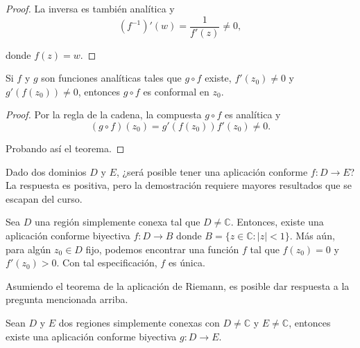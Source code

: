 \begin{proof}
La inversa es también analítica y
$$\left( f^{-1}\right)'(w) = \frac{1}{f'(z)} \neq 0,$$

donde $f(z) = w$.
\end{proof}

\begin{propo}
Si $f$ y $g$ son funciones analíticas tales que $g \circ f$ existe, $f'(z_0) \neq 0$ y $g'(f(z_0)) \neq 0$, entonces $g \circ f$ es conformal en $z_0$.
\end{propo}

\begin{proof}
Por la regla de la cadena, la compuesta $g \circ f$ es analítica y
$$(g\circ f) (z_0) = g'(f(z_0)) f'(z_0) \neq 0.$$

Probando así el teorema.

\end{proof}

Dado dos dominios $D$ y $E$, ¿será posible tener una aplicación conforme $f: D \rightarrow E$? La respuesta es positiva, pero la demostración requiere mayores resultados que se escapan del curso.

\begin{teorema} \label{RiemannMap}
Sea $D$ una región simplemente conexa tal que $D \neq \mathbb{C}$. Entonces, existe una aplicación conforme biyectiva $f: D \rightarrow B$ donde $B = \{z \in \mathbb{C} : |z| < 1\}$. Más aún, para algún $z_0 \in D$ fijo, podemos encontrar una función $f$ tal que $f(z_0) = 0$ y $f'(z_0) > 0$. Con tal especificación, $f$ es única.
\end{teorema}

Asumiendo el teorema de la aplicación de Riemann, es posible dar respuesta a la pregunta mencionada arriba.

\begin{propo}
Sean $D$ y $E$ dos regiones simplemente conexas con $D \neq \mathbb{C}$ y $E \neq \mathbb{C}$, entonces existe una aplicación conforme biyectiva $g: D \rightarrow E$. 
\end{propo}

